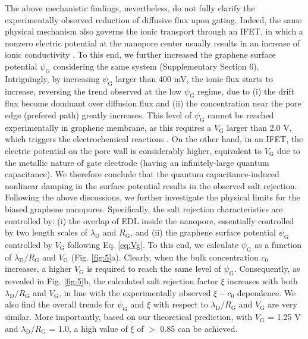 \documentclass[journal=langd5,email=true, hyperref=true, keywords=false]{achemso}
\newcommand{\Fig}{Fig.}
\begin{document}
The above mechanistic findings, nevertheless, do not fully clarify the
experimentally observed reduction of diffusive flux upon
gating. Indeed, the same physical mechanism also governs the ionic
transport through an IFET, in which a nonzero electric potential at
the nanopore center usually results in an increase of ionic
conductivity \cite{Nam_2009,Lee_2015,Feng_2016}. To this end, we
further increased the graphene surface potential $\psi_{\mathrm{G}}$
considering the same system (Supplementary Section 6). Intriguingly,
by increasing $\psi_{\mathrm{G}}$ larger than 400 mV, the ionic flux
starts to increase, reversing the trend observed at the low
$\psi_{\mathrm{G}}$ regime, due to (i) the drift flux become dominant
over diffusion flux and (ii) the concentration near the pore edge
(prefered path) greatly increases. This level of $\psi_{\mathrm{G}}$
cannot be reached experimentally in graphene membrane, as this
requires a $V_{\mathrm{G}}$ larger than 2.0 V, which triggers the
electrochemical reactions \cite{Toh_2011}. On the other hand, in an
IFET, the electric potential on the pore wall is considerably higher,
equivalent to $V_{\mathrm{G}}$ due to the metallic nature of gate
electrode (having an infinitely-large quantum capacitance). We
therefore conclude that the quantum capacitance-induced nonlinear
damping in the surface potential results in the observed salt
rejection.  Following the above discussions, we further investigate
the physical limits for the biased graphene nanopores. Specifically,
the salt rejection characteristics are controlled by: (i) the overlap
of EDL inside the nanopore, essentially controlled by two length
scales of $\lambda_{\mathrm{D}}$ and $R_{\mathrm{G}}$, and (ii) the
graphene surface potential $\psi_{\mathrm{G}}$ controlled by
$V_{\mathrm{G}}$ following Eq. \ref{eq:Vg}. To this end, we calculate
$\psi_{\mathrm{G}}$ as a function of
$\lambda_{\mathrm{D}} / R_{\mathrm{G}}$ and $V_{\mathrm{G}}$ (\Fig{}
\ref{fig:5}a). Clearly, when the bulk concentration $c_{0}$ increases,
a higher $V_{\mathrm{G}}$ is required to reach the same level of
$\psi_{\mathrm{G}}$. Consequently, as revealed in \Fig{} \ref{fig:5}b,
the calculated salt rejection factor $\xi$ increases with both
$\lambda_{\mathrm{D}} / R_{\mathrm{G}}$ and $V_{\mathrm{G}}$, in line
with the experimentally observed $\xi - c_{0}$ dependence. We also
find the overall trends for $\psi_{\mathrm{G}}$ and $\xi$ with respect
to $\lambda_{\mathrm{D}}/R_{\mathrm{G}}$ and $V_{\mathrm{G}}$ are very
similar. More importantly, based on our theoretical prediction, with
$V_{\mathrm{G}}$ = 1.25 V and $\lambda_{\mathrm{D}} / R_{\mathrm{G}}$
= 1.0, a high value of $\xi$ of $>$ 0.85 can be achieved.
\end{document}
